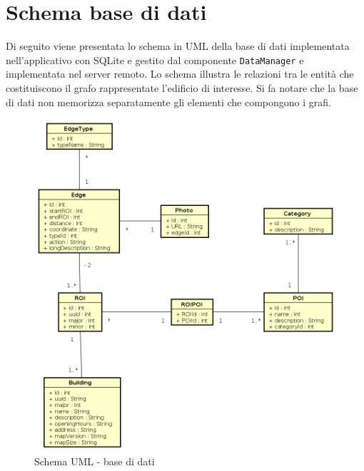 \documentclass[../DefinizioneDiProdotto.tex]{subfiles}
\begin{document}
\section{Schema base di dati}

	Di seguito viene presentata lo schema in UML della base di dati implementata nell'applicativo con SQLite e gestito dal componente \verb|DataManager| e implementata nel server remoto. Lo schema illustra le relazioni tra le entità che costituiscono il grafo rappresentate l'edificio di interesse. Si fa notare che la base di dati non memorizza separatamente gli elementi che compongono i grafi.

	\begin{figure} [h]
			\includegraphics[width=\textwidth]{diagrams/Database}		
			\caption{Schema UML - base di dati}
			\label{Database}
	\end{figure}
\end{document}
